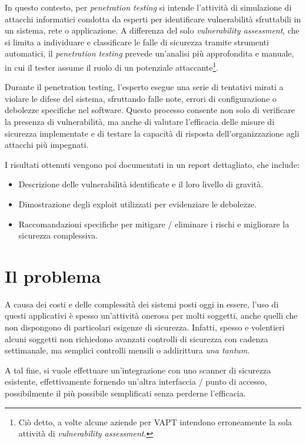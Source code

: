 In questo contesto, per \emph{penetration testing} si intende l'attività di simulazione di attacchi informatici condotta da esperti per identificare vulnerabilità sfruttabili in un sistema, rete o applicazione. A differenza del solo \emph{vulnerability assessment}, che si limita a individuare e classificare le falle di sicurezza tramite strumenti automatici, il \emph{penetration testing} prevede un'analisi più approfondita e manuale, in cui il tester assume il ruolo di un potenziale attaccante\footnote{Ciò detto, a volte alcune aziende per VAPT intendono erroneamente la sola attività di \emph{vulnerability assessment}.}.

Durante il penetration testing, l'esperto esegue una serie di tentativi mirati a violare le difese del sistema, sfruttando falle note, errori di configurazione o debolezze specifiche nel software. Questo processo consente non solo di verificare la presenza di vulnerabilità, ma anche di valutare l'efficacia delle misure di sicurezza implementate e di testare la capacità di risposta dell'organizzazione agli attacchi più impegnati.

I risultati ottenuti vengono poi documentati in un report dettagliato, che include:
\begin{itemize}
    \item Descrizione delle vulnerabilità identificate e il loro livello di gravità.
    \item Dimostrazione degli exploit utilizzati per evidenziare le debolezze.
    \item Raccomandazioni specifiche per mitigare / eliminare i rischi e migliorare la sicurezza complessiva.
\end{itemize}

\section{Il problema}
A causa dei costi e delle complessità dei sistemi posti oggi in essere, l'uso di questi applicativi è spesso un'attività onerosa per molti soggetti, anche quelli che non dispongono di particolari esigenze di sicurezza. Infatti, spesso e volentieri alcuni soggetti non richiedono avanzati controlli di sicurezza con cadenza settimanale, ma semplici controlli mensili o addirittura \emph{una tantum}.

A tal fine, si vuole effettuare un'integrazione con uno scanner di sicurezza esistente, effettivamente fornendo un'altra interfaccia / punto di accesso, possibilmente il più possibile semplificati senza perderne l'efficacia.

